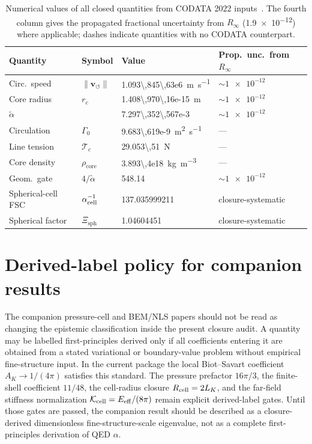 \documentclass[aps,pra,preprint,longbibliography,nofootinbib]{revtex4-2}
\newcommand{\vnorm}{\lVert\mathbf{v}_{\!\boldsymbol{\circlearrowleft}}\rVert} %
\newcommand{\rhocore}{\rho_{\mathrm{core}}}      %
\newcommand{\rc}{r_c}                            %
\newcommand{\Rinf}{R_\infty}                     %
\newcommand{\Tc}{\mathcal{T}_c}                  %
\newcommand{\Gz}{\Gamma_0}                       %
\newcommand{\Xsph}{\Xi_{\mathrm{sph}}}             %
\begin{document}
\begin{table}[h]
\centering
\caption{Numerical values of all closed quantities from CODATA 2022
inputs~\cite{MohrTaylor2022}.
The fourth column gives the propagated fractional uncertainty from $\Rinf$
(\num{1.9e-12}) where applicable; dashes indicate quantities with no
CODATA counterpart.}
\label{tab:numbers}
\begin{tabular}{llll}
\toprule
Quantity & Symbol & Value & Prop.\ unc.\ from $\Rinf$ \\
\midrule
Circ.\ speed   & $\vnorm$ & \SI{1.093\,845\,63e6}{\m\per\s}      & $\sim\num{1e-12}$ \\
Core radius    & $\rc$    & \SI{1.408\,970\,16e-15}{\meter}       & $\sim\num{1e-12}$ \\
$\tilde\alpha$ &          & \num{7.297\,352\,567e-3}              & $\sim\num{1e-12}$ \\
Circulation    & $\Gz$    & \SI{9.683\,619e-9}{\m\squared\per\s}  & — \\
Line tension   & $\Tc$    & \SI{29.053\,51}{\newton}               & — \\
Core density   & $\rhocore$& \SI{3.893\,4e18}{\kg\per\m\cubed}    & — \\
Geom.\ gate    & $4/\tilde\alpha$ & \num{548.14}               & $\sim\num{1e-12}$ \\
Spherical-cell FSC & $\alpha_{\rm cell}^{-1}$ & \num{137.035999211} & closure-systematic \\
Spherical factor & $\Xsph$ & \num{1.04604451} & closure-systematic \\
\bottomrule
\end{tabular}
\end{table}


\section{Derived-label policy for companion results}
\label{sec:derived-label-policy}

The companion pressure-cell and BEM/NLS papers should not be read as changing
the epistemic classification inside the present closure audit.  A quantity may
be labelled first-principles derived only if all coefficients entering it are
obtained from a stated variational or boundary-value problem without empirical
fine-structure input.  In the current package the local Biot--Savart coefficient
\(A_K\to1/(4\pi)\) satisfies this standard.  The pressure prefactor \(16\pi/3\),
the finite-shell coefficient \(11/48\), the cell-radius closure
\(R_{\rm cell}=2L_K\), and the far-field stiffness normalization
\(\mathcal K_{\rm cell}=E_{\rm eff}/(8\pi)\) remain explicit derived-label
gates.  Until those gates are passed, the companion result should be described
as a closure-derived dimensionless fine-structure-scale eigenvalue, not as a
complete first-principles derivation of QED \(\alpha\).
\end{document}
